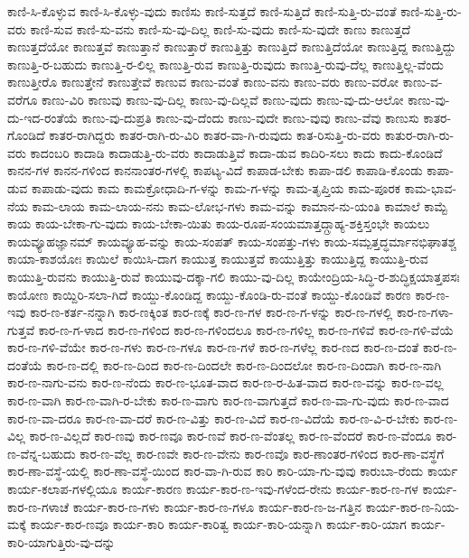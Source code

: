 {ಕಾಣಿ-ಸಿ-ಕೊಳ್ಳುವ
ಕಾಣಿ-ಸಿ-ಕೊಳ್ಳು-ವುದು
ಕಾಣಿಸು
ಕಾಣಿ-ಸುತ್ತದೆ
ಕಾಣಿ-ಸುತ್ತಿದೆ
ಕಾಣಿ-ಸುತ್ತಿ-ರು-ವಂತೆ
ಕಾಣಿ-ಸುತ್ತಿ-ರು-ವರು
ಕಾಣಿ-ಸುವ
ಕಾಣಿ-ಸು-ವನು
ಕಾಣಿ-ಸು-ವು-ದಿಲ್ಲ
ಕಾಣಿ-ಸು-ವುದು
ಕಾಣಿ-ಸು-ವುದೇ
ಕಾಣು
ಕಾಣುತ್ತದೆ
ಕಾಣುತ್ತದೆಯೋ
ಕಾಣುತ್ತವೆ
ಕಾಣುತ್ತಾನೆ
ಕಾಣುತ್ತಾರೆ
ಕಾಣುತ್ತಿತ್ತು
ಕಾಣುತ್ತಿದೆ
ಕಾಣುತ್ತಿದೆಯೋ
ಕಾಣುತ್ತಿದ್ದ
ಕಾಣುತ್ತಿದ್ದು
ಕಾಣುತ್ತಿ-ರ-ಬಹುದು
ಕಾಣುತ್ತಿ-ರ-ಲಿಲ್ಲ
ಕಾಣುತ್ತಿ-ರುವ
ಕಾಣುತ್ತಿ-ರುವುದು
ಕಾಣುತ್ತಿ-ರುವು-ದೆಲ್ಲ
ಕಾಣುತ್ತಿಲ್ಲ-ವೆಂದು
ಕಾಣುತ್ತೀರೊ
ಕಾಣುತ್ತೇನೆ
ಕಾಣುತ್ತೇವೆ
ಕಾಣುವ
ಕಾಣು-ವಂತೆ
ಕಾಣು-ವನು
ಕಾಣು-ವರು
ಕಾಣು-ವರೋ
ಕಾಣು-ವ-ವರೆಗೂ
ಕಾಣು-ವಿರಿ
ಕಾಣುವು
ಕಾಣು-ವು-ದಿಲ್ಲ
ಕಾಣು-ವು-ದಿಲ್ಲವೆ
ಕಾಣು-ವುದು
ಕಾಣು-ವು-ದು-ಆಲೋ
ಕಾಣು-ವು-ದು-ಇದ-ರಂತೆಯೆ
ಕಾಣು-ವು-ದುಪ್ರತಿ
ಕಾಣು-ವು-ದೆಂದು
ಕಾಣು-ವುದೇ
ಕಾಣು-ವುವು
ಕಾಣು-ವೆವು
ಕಾಣುಸು
ಕಾತರ-ಗೊಂಡಿದೆ
ಕಾತರ-ರಾಗಿದ್ದರು
ಕಾತರ-ರಾಗಿ-ರು-ವಿರಿ
ಕಾತರ-ವಾ-ಗಿ-ರುವುದು
ಕಾತ-ರಿಸುತ್ತಿ-ರು-ವರು
ಕಾತುರ-ರಾಗಿ-ರು-ವರು
ಕಾದಂಬರಿ
ಕಾದಾಡಿ
ಕಾದಾಡುತ್ತಿ-ರು-ವರು
ಕಾದಾಡುತ್ತಿವೆ
ಕಾದಾ-ಡುವ
ಕಾದಿರಿ-ಸಲು
ಕಾದು
ಕಾದು-ಕೊಂಡಿದೆ
ಕಾನನ-ಗಳ
ಕಾನನ-ಗಳಿಂದ
ಕಾನನಾಂತರ-ಗಳಲ್ಲಿ
ಕಾಪಟ್ಯ-ವಿದೆ
ಕಾಪಾಡ-ಬೇಕು
ಕಾಪಾ-ಡಲಿ
ಕಾಪಾಡಿ-ಕೊಂಡು
ಕಾಪಾ-ಡುವ
ಕಾಪಾಡು-ವುದು
ಕಾಮ
ಕಾಮಕ್ರೋಧಾದಿ-ಗ-ಳನ್ನು
ಕಾಮ-ಗ-ಳನ್ನು
ಕಾಮ-ತೃಪ್ತಿಯ
ಕಾಮ-ಪೂರಕ
ಕಾಮ-ಭಾವ-ನೆಯ
ಕಾಮ-ಲಾಯ
ಕಾಮ-ಲಾಯ-ನನು
ಕಾಮ-ಲೋಭ-ಗಳು
ಕಾಮ-ವನ್ನು
ಕಾಮಾನ-ನು-ಯಂತಿ
ಕಾಮಾಲೆ
ಕಾಮ್ಟೆ
ಕಾಯ
ಕಾಯ-ಬೇಕಾ-ಗು-ವುದು
ಕಾಯ-ಬೇಕಾ-ಯಿತು
ಕಾಯ-ರೂಪ-ಸಂಯಮಾತ್ತದ್ಗ್ರಾಹ್ಯ-ಶಕ್ತಿಸ್ತಂಭೇ
ಕಾಯಲು
ಕಾಯವ್ಯೂಹಜ್ಞಾನಮ್
ಕಾಯವ್ಯೂಹ-ವನ್ನು
ಕಾಯ-ಸಂಪತ್
ಕಾಯ-ಸಂಪತ್ತು-ಗಳು
ಕಾಯ-ಸಮ್ಪತ್ತದ್ಧರ್ಮಾನಭಿಘಾತಶ್ಚ
ಕಾಯಾ-ಕಾಶಯೋಃ
ಕಾಯಿಲೆ
ಕಾಯಿಸಿ-ದಾಗ
ಕಾಯುತ್ತ
ಕಾಯುತ್ತವೆ
ಕಾಯುತ್ತಿತ್ತು
ಕಾಯುತ್ತಿದ್ದ
ಕಾಯುತ್ತಿ-ರುವ
ಕಾಯುತ್ತಿ-ರುವನು
ಕಾಯುತ್ತಿ-ರುವೆ
ಕಾಯುವು-ದಕ್ಕಾ-ಗಲಿ
ಕಾಯು-ವು-ದಿಲ್ಲ
ಕಾಯೇಂದ್ರಿಯ-ಸಿದ್ಧಿ-ರ-ಶುದ್ಧಿಕ್ಷಯಾತ್ತಪಸಃ
ಕಾಯೋಣ
ಕಾಯ್ದಿರಿ-ಸಲಾ-ಗಿದೆ
ಕಾಯ್ದು-ಕೊಂಡಿದ್ದ
ಕಾಯ್ದು-ಕೊಂಡಿ-ರು-ವಂತೆ
ಕಾಯ್ದು-ಕೊಂಡಿವೆ
ಕಾರಣ
ಕಾರ-ಣ-ಇವು
ಕಾರ-ಣ-ಕರ್ತ-ನನ್ನಾಗಿ
ಕಾರ-ಣಕ್ಕಿಂತ
ಕಾರ-ಣಕ್ಕೆ
ಕಾರ-ಣ-ಗಳ
ಕಾರ-ಣ-ಗ-ಳನ್ನು
ಕಾರ-ಣ-ಗಳಲ್ಲಿ
ಕಾರ-ಣ-ಗಳಾ-ಗುತ್ತವೆ
ಕಾರ-ಣ-ಗ-ಳಾದ
ಕಾರ-ಣ-ಗಳಿಂದ
ಕಾರ-ಣ-ಗಳಿಂದಲೂ
ಕಾರ-ಣ-ಗಳಿಲ್ಲ
ಕಾರ-ಣ-ಗಳಿವೆ
ಕಾರ-ಣ-ಗಳಿ-ವೆಯೆ
ಕಾರ-ಣ-ಗಳಿ-ವೆಯೇ
ಕಾರ-ಣ-ಗಳು
ಕಾರ-ಣ-ಗಳೂ
ಕಾರ-ಣ-ಗಳೆ
ಕಾರ-ಣ-ಗಳೆಲ್ಲ
ಕಾರ-ಣದ
ಕಾರ-ಣ-ದಂತೆ
ಕಾರ-ಣ-ದಂತೆಯೆ
ಕಾರ-ಣ-ದಲ್ಲಿ
ಕಾರ-ಣ-ದಿಂದ
ಕಾರ-ಣ-ದಿಂದಲೇ
ಕಾರ-ಣ-ದಿಂದಲೋ
ಕಾರ-ಣ-ದಿಂದಾಗಿ
ಕಾರ-ಣ-ನಾಗಿ
ಕಾರ-ಣ-ನಾಗು-ವನು
ಕಾರ-ಣ-ನೆಂದು
ಕಾರ-ಣ-ಭೂತ-ವಾದ
ಕಾರ-ಣ-ರ-ಹಿತ-ವಾದ
ಕಾರ-ಣ-ವನ್ನು
ಕಾರ-ಣ-ವಲ್ಲ
ಕಾರ-ಣ-ವಾಗಿ
ಕಾರ-ಣ-ವಾಗಿ-ರ-ಬೇಕು
ಕಾರ-ಣ-ವಾಗು
ಕಾರ-ಣ-ವಾಗುತ್ತದೆ
ಕಾರ-ಣ-ವಾ-ಗು-ವುದು
ಕಾರ-ಣ-ವಾದ
ಕಾರ-ಣ-ವಾ-ದರೂ
ಕಾರ-ಣ-ವಾ-ದರೆ
ಕಾರ-ಣ-ವಿತ್ತು
ಕಾರ-ಣ-ವಿದೆ
ಕಾರ-ಣ-ವಿದೆಯೆ
ಕಾರ-ಣ-ವಿ-ರ-ಬೇಕು
ಕಾರ-ಣ-ವಿಲ್ಲ
ಕಾರ-ಣ-ವಿಲ್ಲದೆ
ಕಾರ-ಣವು
ಕಾರ-ಣವೂ
ಕಾರ-ಣವೆ
ಕಾರ-ಣ-ವೆಂತಲ್ಲ
ಕಾರ-ಣ-ವೆಂದರೆ
ಕಾರ-ಣ-ವೆಂದೂ
ಕಾರ-ಣ-ವೆನ್ನ-ಬಹುದು
ಕಾರ-ಣ-ವೆಲ್ಲ
ಕಾರ-ಣವೇ
ಕಾರ-ಣ-ವೇನು
ಕಾರ-ಣವೊ
ಕಾರ-ಣಾಂತರ-ಗಳಿಂದ
ಕಾರ-ಣಾ-ವಸ್ಥೆಗೆ
ಕಾರ-ಣಾ-ವಸ್ಥೆ-ಯಲ್ಲಿ
ಕಾರ-ಣಾ-ವಸ್ಥೆ-ಯಿಂದ
ಕಾರ-ವಾ-ಗಿ-ರುವ
ಕಾರಿ
ಕಾರಿ-ಯಾ-ಗು-ವುವು
ಕಾರುಬಾ-ರೆಂದು
ಕಾರ್ಯ
ಕಾರ್ಯ-ಕಲಾಪ-ಗಳಲ್ಲಿಯೂ
ಕಾರ್ಯ-ಕಾರಣ
ಕಾರ್ಯ-ಕಾರ-ಣ-ಇವು-ಗಳೆಂದ-ರೇನು
ಕಾರ್ಯ-ಕಾರ-ಣ-ಗಳ
ಕಾರ್ಯ-ಕಾರ-ಣ-ಗಳಾಚೆ
ಕಾರ್ಯ-ಕಾರ-ಣ-ಗಳು
ಕಾರ್ಯ-ಕಾರ-ಣ-ಗಳೂ
ಕಾರ್ಯ-ಕಾರ-ಣ-ಜ-ಗತ್ತಿನ
ಕಾರ್ಯ-ಕಾರ-ಣ-ನಿಯ-ಮಕ್ಕೆ
ಕಾರ್ಯ-ಕಾರ-ಣವೂ
ಕಾರ್ಯ-ಕಾರಿ
ಕಾರ್ಯ-ಕಾರಿತ್ವ
ಕಾರ್ಯ-ಕಾರಿ-ಯನ್ನಾಗಿ
ಕಾರ್ಯ-ಕಾರಿ-ಯಾಗ
ಕಾರ್ಯ-ಕಾರಿ-ಯಾಗುತ್ತಿರು-ವು-ದನ್ನು
}
